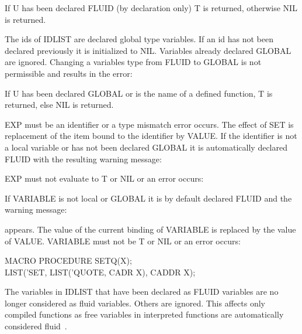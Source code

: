 \documentclass[11pt,letterpaper]{book}
\begin{document}
{If U has been declared FLUID (by declaration only) T is returned,
otherwise NIL is returned.}


{The ids of IDLIST are declared global type variables. If an id has
not been declared previously it is initialized to NIL. Variables
already declared GLOBAL are ignored. Changing a variables type from
FLUID to GLOBAL is not permissible and results in the error:

}


{If U has been declared GLOBAL or is the name of a defined function, T
is returned, else NIL is returned.}


{EXP must be an identifier or a type mismatch error occurs. The effect
of SET is replacement of the item bound to the identifier by VALUE.
If the identifier is not a local variable or has not been declared
GLOBAL it is automatically declared FLUID with the resulting warning
message:


EXP must not evaluate to T or NIL or an error occurs:
 

}

{If VARIABLE is not local or GLOBAL it is by default declared FLUID
and the warning message:


appears. The value of the current binding of VARIABLE is replaced by
the value of VALUE. VARIABLE must not be T or NIL or an error occurs:
 


{\tt \begin{tabbing} MACRO PROCEDURE SETQ(X); \\
\hspace*{1em} LIST('SET, LIST('QUOTE, CADR X), CADDR X);
\end{tabbing}}
}

{The variables in IDLIST that have been declared as FLUID variables
are no longer considered as fluid variables. Others are ignored. This
affects only compiled functions as free variables in interpreted
functions are automatically considered fluid~\cite{PLC}.
}
\end{document}
